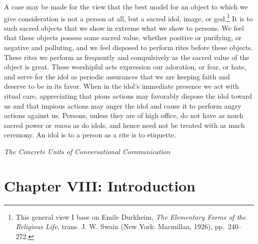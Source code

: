 \documentclass[openany,nobib]{tufte-book}
\let\oldchapter\chapter
\def\chapter{%
  \setcounter{footnote}{0}%
  \oldchapter
}
\begin{document}
A case may be made for the view that the best model for an object to
which we give consideration is not a person at all, but a sacred idol,
image, or god.\footnote{This general view I base on Emile Durkheim,
  \emph{The Elementary Forms of the Religious Life}, trans. J. W. Swain
  (New York: Macmillan, 1926), pp.~240--272.} It is to such sacred
objects that we show in extreme what we show to persons. We feel that
these objects possess some sacred value, whether positive or purifying,
or negative and polluting, and we feel disposed to perform rites before
these objects. These rites we perform as frequently and compulsively as
the sacred value of the object is great. These worshipful acts
expression our adoration, or fear, or hate, and serve for the idol as
periodic assurances that we are keeping faith and deserve to be in its
favor. When in the idol's immediate presence we act with ritual care,
appreciating that pious actions may favorably dispose the idol toward us
and that impious actions may anger the idol and cause it to perform
angry actions against us. Persons, unless they are of high office, do
not have as much sacred power or \emph{mana} as do idols, and hence need
not be treated with as much ceremony. An idol is to a person as a rite
is to etiquette.



\newpage
\thispagestyle{empty}
\begin{fullwidth}

\begin{center}
\vspace*{3in}

{\fontsize{35}{24}\selectfont{Part Four}\par}

\vspace{1in}

{\fontsize{35}{24}\selectfont\textit{The Concrete Units of Conversational Communication}\par}

\end{center}

\end{fullwidth}

\chapter[CHAPTER VIII: INTRODUCTION]{Chapter VIII: Introduction}
\label{ch:Chapter VIII: Introduction}
\end{document}
